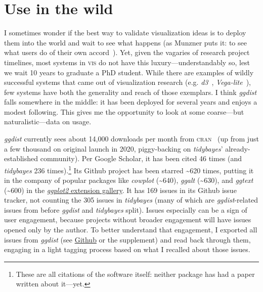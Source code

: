 \documentclass[journal]{vgtc}                     %
\begin{document}
\section{Use in the wild}
\label{sec:use-in-the-wild}


I sometimes wonder if the best way to validate visualization ideas is to deploy them into the world and wait to see what happens (as Munzner puts it: to see what users do of their own accord~\cite{munzner2009nested}). Yet, given the vagaries of research project timelines, most systems in \textsc{vis} do not have this luxury---understandably so, lest we wait 10 years to graduate a PhD student. While there are examples of wildly successful systems that came out of visualization research (e.g. \textit{d3}~\cite{bostock2011d3}, \textit{Vega-lite}~\cite{satyanarayan2016vega}), few systems have both the generality and reach of those exemplars. I think \textit{ggdist} falls somewhere in the middle: it has been deployed for several years and enjoys a modest following. This gives me the opportunity to look at some coarse---but naturalistic---data on usage.

\textit{ggdist} currently sees about 14,000 downloads per month from \textsc{cran}~\cite{csardi2019cranlogs} (up from just a few thousand on original launch in 2020, piggy-backing on \textit{tidybayes}' already-established community). Per Google Scholar, it has been cited 46 times (and \textit{tidybayes} 236 times).\footnote{These are all citations of the software itself: neither package has had a paper written about it---yet.} Its Github project has been starred \textasciitilde 620 times, putting it in the company of popular packages like \textit{cowplot} (\textasciitilde 640), \textit{ggalt} (\textasciitilde 630), and \textit{ggtext} (\textasciitilde 600) in the \href{https://exts.ggplot2.tidyverse.org/gallery/}{\textit{ggplot2} extension gallery}. It has 169 issues in its Github issue tracker, not counting the 305 issues in \textit{tidybayes} (many of which are \textit{ggdist}-related issues from before \textit{ggdist} and \textit{tidybayes} split). Issues especially can be a sign of user engagement, because projects without broader engagement will have issues opened only by the author. To better understand that engagement, I exported all issues from \textit{ggdist} (see \href{https://github.com/mjskay/ggdist/issues}{Github} or the supplement) and read back through them, engaging in a light tagging process based on what I recalled about those issues.
\end{document}
